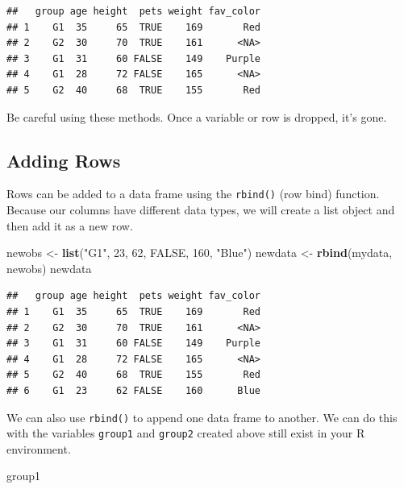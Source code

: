 \documentclass[
]{book}
\newenvironment{Shaded}{\begin{snugshade}}{\end{snugshade}}
\newcommand{\DecValTok}[1]{\textcolor[rgb]{0.00,0.00,0.81}{#1}}
\newcommand{\KeywordTok}[1]{\textcolor[rgb]{0.13,0.29,0.53}{\textbf{#1}}}
\newcommand{\NormalTok}[1]{#1}
\newcommand{\OtherTok}[1]{\textcolor[rgb]{0.56,0.35,0.01}{#1}}
\newcommand{\StringTok}[1]{\textcolor[rgb]{0.31,0.60,0.02}{#1}}
\begin{document}
\begin{verbatim}
##   group age height  pets weight fav_color
## 1    G1  35     65  TRUE    169       Red
## 2    G2  30     70  TRUE    161      <NA>
## 3    G1  31     60 FALSE    149    Purple
## 4    G1  28     72 FALSE    165      <NA>
## 5    G2  40     68  TRUE    155       Red
\end{verbatim}

Be careful using these methods. Once a variable or row is dropped, it's gone.

\hypertarget{adding-rows}{%
\subsection*{Adding Rows}\label{adding-rows}}

Rows can be added to a data frame using the \texttt{rbind()} (row bind) function. Because our columns have different data types, we will create a list object and then add it as a new row.

\begin{Shaded}
\begin{Highlighting}[]
\NormalTok{newobs <-}\StringTok{ }\KeywordTok{list}\NormalTok{(}\StringTok{"G1"}\NormalTok{, }\DecValTok{23}\NormalTok{, }\DecValTok{62}\NormalTok{, }\OtherTok{FALSE}\NormalTok{, }\DecValTok{160}\NormalTok{, }\StringTok{"Blue"}\NormalTok{)}
\NormalTok{newdata <-}\StringTok{ }\KeywordTok{rbind}\NormalTok{(mydata, newobs)}
\NormalTok{newdata}
\end{Highlighting}
\end{Shaded}

\begin{verbatim}
##   group age height  pets weight fav_color
## 1    G1  35     65  TRUE    169       Red
## 2    G2  30     70  TRUE    161      <NA>
## 3    G1  31     60 FALSE    149    Purple
## 4    G1  28     72 FALSE    165      <NA>
## 5    G2  40     68  TRUE    155       Red
## 6    G1  23     62 FALSE    160      Blue
\end{verbatim}

We can also use \texttt{rbind()} to append one data frame to another. We can do this with the variables \texttt{group1} and \texttt{group2} created above still exist in your R environment.

\begin{Shaded}
\begin{Highlighting}[]
\NormalTok{group1}
\end{Highlighting}
\end{Shaded}
\end{document}
